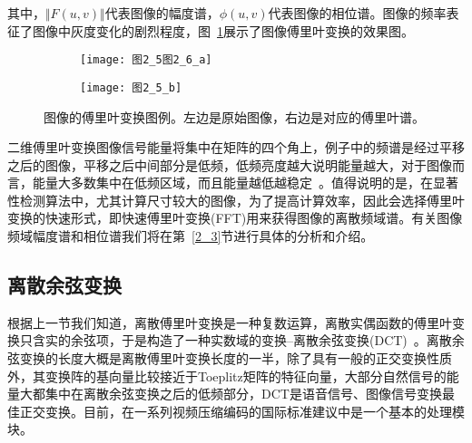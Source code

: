 其中，$\Vert F(u,v)\Vert$代表图像的幅度谱，$\phi(u,v)$代表图像的相位谱。图像的频率表征了图像中灰度变化的剧烈程度，图~\ref{图2_5}展示了图像傅里叶变换的效果图。
\begin{figure}[t]
  \centering%
  \begin{subfigure}{3cm}
    \texttt{[image: 图2\_5图2\_6\_a]}
  \end{subfigure}
  \hspace{4em}%
  \begin{subfigure}{0.25\textwidth}
    \texttt{[image: 图2\_5\_b]}
  \end{subfigure}
  \caption{图像的傅里叶变换图例。左边是原始图像，右边是对应的傅里叶谱。}
  \label{图2_5} 
\end{figure}

二维傅里叶变换图像信号能量将集中在矩阵的四个角上，例子中的频谱是经过平移之后的图像，平移之后中间部分是低频，低频亮度越大说明能量越大，对于图像而言，能量大多数集中在低频区域，而且能量越低越稳定~\cite{Gonzalez2005book}。值得说明的是，在显著性检测算法中，尤其计算尺寸较大的图像，为了提高计算效率，因此会选择傅里叶变换的快速形式，即快速傅里叶变换(FFT)用来获得图像的离散频域谱。有关图像频域幅度谱和相位谱我们将在第~\ref{2_3}节进行具体的分析和介绍。

\subsection{离散余弦变换}
\label{2_2_2}

根据上一节我们知道，离散傅里叶变换是一种复数运算，离散实偶函数的傅里叶变换只含实的余弦项，于是构造了一种实数域的变换--离散余弦变换(DCT)~\cite{Rao2014book}。离散余弦变换的长度大概是离散傅里叶变换长度的一半，除了具有一般的正交变换性质外，其变换阵的基向量比较接近于Toeplitz矩阵的特征向量，大部分自然信号的能量大都集中在离散余弦变换之后的低频部分，DCT是语音信号、图像信号变换最佳正交变换。目前，在一系列视频压缩编码的国际标准建议中是一个基本的处理模块。

